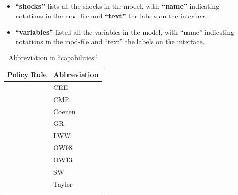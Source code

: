 \documentclass[10pt,a4paper]{article}
\begin{document}
\begin{itemize}
\item \textbf{“shocks”} lists all the shocks in the model, with \textbf{“name”} indicating notations in the mod-file and \textbf{“text”} the labels on the interface.

\item \textbf{“variables”} listed all the variables in the model, with “name” indicating notations in the mod-file and “text” the labels on the interface.
\end{itemize}

\begin{table}
\caption{Abbreviation in “capabilities“}
\begin{tabular}[t]{ l l }
 \textbf{Policy Rule} & \textbf{Abbreviation} \\ 
\hline
\hline
 \cite{ChristianoEichenbaumEvans2005} & CEE \\
 \cite{CMR2014} & CMR \\
 \cite{Coenenetal2012} & Coenen \\
 \cite{GerdesmeierRoffia2004} & GR \\
 \cite{LevinWielandWilliams2003} & LWW \\  
 \cite{OrphanidesWieland2008} & OW08 \\
 \cite{OrphanidesWieland2013} & OW13 \\ 
 \cite{SmetsWouters2007} & SW \\
 \cite{Taylor1993} & Taylor \\ 
\hline
\end{tabular}
\end{table}
\end{document}
